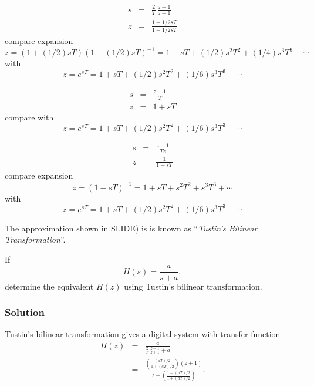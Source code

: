 \begin{slide}\label{slide:l11s22}

  \begin{eqnarray*}
     s &=& \frac{2}{T}\, \frac{z-1}{z+1} \\
     z &=& \frac{1 + 1/2 sT}{1 - 1/2 sT}
  \end{eqnarray*}
  compare expansion $$z=(1+ (1/2) sT)(1- (1/2) sT)^{-1} = 1 + sT + (1/2)
 s^2T^2 + (1/4) s^3T^3
 + \cdots$$  with $$z = e^{sT} = 1 + sT + (1/2) s^2T^2 + (1/6) s^3T^3 + \cdots$$
\end{slide}

\begin{slide}\label{slide:l11s20}

  \begin{eqnarray*}
     s &=& \frac{z-1}{T} \\
     z &=& 1 + sT
  \end{eqnarray*}
  compare with $$z = e^{sT} = 1 + sT + (1/2) s^2T^2 + (1/6) s^3T^3 + \cdots$$
\end{slide}

\begin{slide}\label{slide:l11s21}

  \begin{eqnarray*}
     s &=& \frac{z-1}{Tz} \\
     z &=& \frac{1}{1 + sT}
  \end{eqnarray*}
  compare expansion $$z=(1-sT)^{-1} = 1 + sT + s^2T^2 + s^3T^3
 + \cdots$$  with $$z = e^{sT} = 1 + sT + (1/2) s^2T^2 + (1/6) s^3T^3 + \cdots$$
\end{slide}


The approximation shown in SLIDE) is
is known as ``\emph{Tustin's Bilinear Transformation}''.

\begin{slide}\label{slide:l11s23}
  If \[H(s) = \frac{a}{s+a},\] determine the equivalent $H(z)$ using Tustin's
  bilinear transformation.
\end{slide}

\subsubsection{Solution}
Tustin's bilinear transformation gives a
 digital system with transfer function
 \begin{eqnarray*}
   H(z)&=& \frac{a}{\frac{2}{T}\,\frac{z-1}{z+1}+a} \\
       &=& \frac{\left(\frac{(aT)/2}{1+(aT)/2}\right)(z+1)}{z-\left(\frac{1-(aT)/2}{1+(aT)/2}\right)}.
 \end{eqnarray*}

